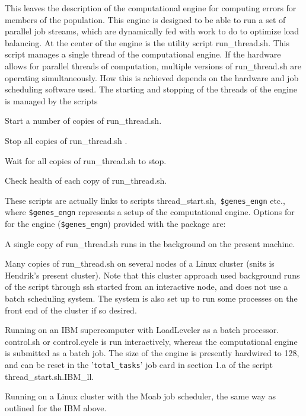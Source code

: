 \documentclass[12pt]{article}
\newcommand{\file}{\sf}
\newcommand{\code}{\tt}
\newenvironment{flist2}{\begin{list}{nofile ?}{\parsep 0mm
            \itemsep 0mm \leftmargin 45mm \labelwidth 35mm
            \rightmargin 10mm}}{\end{list}}
\newcommand{\fit}[2]{\item[{\file{#1}}\hfill]{#2}}
\newenvironment{plist}{\begin{list}{nofile ?}{\parsep 0mm
            \itemsep 0mm \leftmargin 35mm \labelwidth 25mm
            \rightmargin 10mm}}{\end{list}}
\newcommand{\pit}[2]{\item[{\code{#1}}\hfill]{#2}}
\begin{document}
\vspace{\baselineskip}
\noindent
This leaves the description of the computational engine for computing errors
for members of the population. This engine is designed to be able to run a set
of parallel job streams, which are dynamically fed with work to do to optimize
load balancing. At the center of the engine is the utility script {\file
run\_thread.sh}. This script manages a single thread of the computational
engine. If the hardware allows for parallel threads of computation, multiple
versions of {\file run\_thread.sh} are operating simultaneously. How this is
achieved depends on the hardware and job scheduling software used. The
starting and stopping of the threads of the engine is managed by the scripts

\begin{flist2}
\fit{thread\_start.sh}{Start a number of copies of {\file run\_thread.sh}.}
\fit{thread\_stop.sh}{Stop all copies of {\file run\_thread.sh} .}
\fit{thread\_wait.sh}{Wait for all copies of {\file run\_thread.sh} to stop.}
\fit{thread\_check.sh}{Check health of each copy of {\file run\_thread.sh}.}
\end{flist2}

\noindent
These scripts are actually links to scripts {\file thread\_start.sh,}{\code
\$genes\_engn} etc., where {\code \$genes\_engn} represents a setup of the
computational engine. Options for for the engine ({\code \$genes\_engn})
provided with the package are:

\begin{plist}
\pit{single}{A single copy of {\file run\_thread.sh} runs in the background on
             the present machine.}

\pit{snits} {Many copies of {\file run\_thread.sh} on several nodes of a Linux
             cluster (snits is Hendrik's present cluster). Note that this
             cluster approach used background runs of the script through
             {\file ssh} started from an interactive node, and does not use a
             batch scheduling system. The system is also set up to run some
             processes on the front end of the cluster if so desired.}

\pit{IBM\_ll}{Running on an IBM supercomputer with LoadLeveler as a batch
             processor. {\file control.sh} or {\file control.cycle} is run
             interactively, whereas the computational engine is submitted as a
             batch job. The size of the engine is presently hardwired to 128,
             and can be reset in the '{\code total\_tasks}' job card in
             section 1.a of the script {\file thread\_start.sh.IBM\_ll}.}

\pit{Moab}  {Running on a Linux cluster with the Moab job scheduler, the same
             way as outlined for the IBM above.} 

\end{plist}
\end{document}
